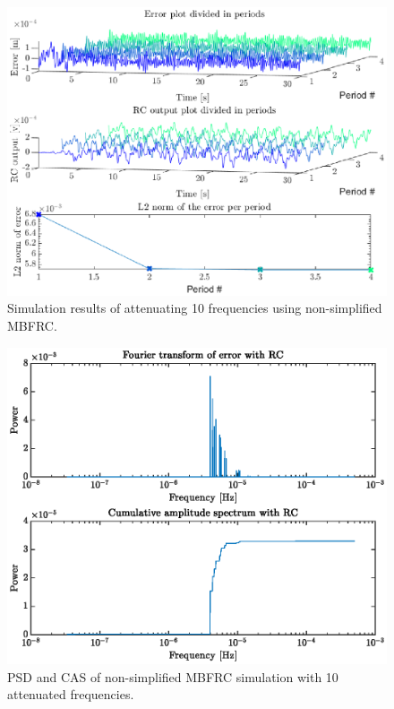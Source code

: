 \documentclass[journal]{IEEEtran}
\begin{document}
\begin{figure}
    \centering
    \includegraphics[width=1\linewidth]{figures/nonSimple_RC_MBFRC/SimulationNonSimp10.eps}
    \caption{Simulation results of attenuating 10 frequencies using non-simplified MBFRC.}
    \label{fig:SimNonSimp10}
\end{figure}
\begin{figure}
    \centering
    \includegraphics[width=1\linewidth]{figures/nonSimple_RC_MBFRC/FourierNonSimp10.eps}
    \caption{PSD and CAS of non-simplified MBFRC simulation with 10 attenuated frequencies.}
    \label{fig:fftNonSimp10}
\end{figure}
\end{document}

